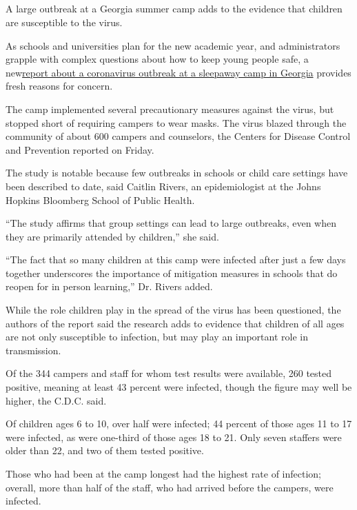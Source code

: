 \hypertarget{-5}{%
\subsection{}\label{-5}}

A large outbreak at a Georgia summer camp adds to the evidence that
children are susceptible to the virus.

As schools and universities plan for the new academic year, and
administrators grapple with complex questions about how to keep young
people safe, a
new\href{https://www.cdc.gov/mmwr/volumes/69/wr/mm6931e1.htm?s_cid=mm6931e1_w}{report
about a coronavirus outbreak at a sleepaway camp in Georgia} provides
fresh reasons for concern.

The camp implemented several precautionary measures against the virus,
but stopped short of requiring campers to wear masks. The virus blazed
through the community of about 600 campers and counselors, the Centers
for Disease Control and Prevention reported on Friday.

The study is notable because few outbreaks in schools or child care
settings have been described to date, said Caitlin Rivers, an
epidemiologist at the Johns Hopkins Bloomberg School of Public Health.

``The study affirms that group settings can lead to large outbreaks,
even when they are primarily attended by children,'' she said.

``The fact that so many children at this camp were infected after just a
few days together underscores the importance of mitigation measures in
schools that do reopen for in person learning,'' Dr. Rivers added.

While the role children play in the spread of the virus has been
questioned, the authors of the report said the research adds to evidence
that children of all ages are not only susceptible to infection, but may
play an important role in transmission.

Of the 344 campers and staff for whom test results were available, 260
tested positive, meaning at least 43 percent were infected, though the
figure may well be higher, the C.D.C. said.

Of children ages 6 to 10, over half were infected; 44 percent of those
ages 11 to 17 were infected, as were one-third of those ages 18 to 21.
Only seven staffers were older than 22, and two of them tested positive.

Those who had been at the camp longest had the highest rate of
infection; overall, more than half of the staff, who had arrived before
the campers, were infected.

